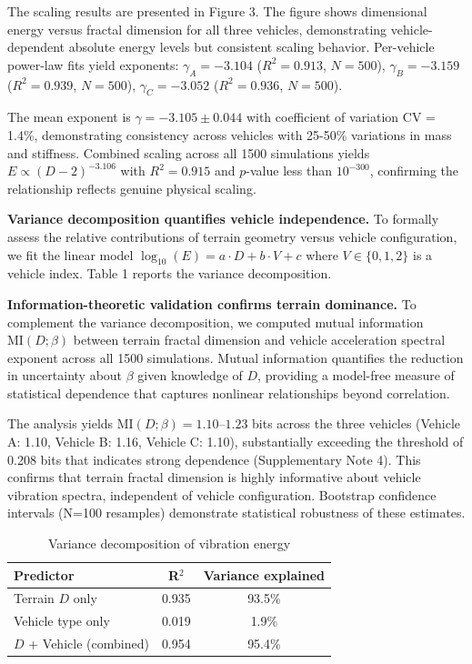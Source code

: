 \documentclass[11pt]{article}
\begin{document}
The scaling results are presented in Figure 3. The figure shows dimensional energy versus fractal dimension for all three vehicles, demonstrating vehicle-dependent absolute energy levels but consistent scaling behavior. Per-vehicle power-law fits yield exponents: $\gamma_A = -3.104$ ($R^2 = 0.913$, $N = 500$), $\gamma_B = -3.159$ ($R^2 = 0.939$, $N = 500$), $\gamma_C = -3.052$ ($R^2 = 0.936$, $N = 500$). 

The mean exponent is $\gamma = -3.105 \pm 0.044$ with coefficient of variation CV = 1.4\%, demonstrating consistency across vehicles with 25-50\% variations in mass and stiffness. Combined scaling across all 1500 simulations yields $E \propto (D-2)^{-3.106}$ with $R^2 = 0.915$ and $p$-value less than $10^{-300}$, confirming the relationship reflects genuine physical scaling.

\textbf{Variance decomposition quantifies vehicle independence.} To formally assess the relative contributions of terrain geometry versus vehicle configuration, we fit the linear model $\log_{10}(E) = a \cdot D + b \cdot V + c$ where $V \in \{0,1,2\}$ is a vehicle index. Table 1 reports the variance decomposition.

\textbf{Information-theoretic validation confirms terrain dominance.} To complement the variance decomposition, we computed mutual information $\text{MI}(D;\beta)$ between terrain fractal dimension and vehicle acceleration spectral exponent across all 1500 simulations. Mutual information quantifies the reduction in uncertainty about $\beta$ given knowledge of $D$, providing a model-free measure of statistical dependence that captures nonlinear relationships beyond correlation\cite{Cover2006}. 

The analysis yields $\text{MI}(D;\beta) = 1.10$--$1.23$ bits across the three vehicles (Vehicle A: 1.10, Vehicle B: 1.16, Vehicle C: 1.10), substantially exceeding the threshold of 0.208 bits that indicates strong dependence (Supplementary Note 4). This confirms that terrain fractal dimension is highly informative about vehicle vibration spectra, independent of vehicle configuration. Bootstrap confidence intervals (N=100 resamples) demonstrate statistical robustness of these estimates.

\begin{table}[h]
\centering
\caption{Variance decomposition of vibration energy}
\begin{tabular}{lcc}
\hline
Predictor & R$^2$ & Variance explained \\
\hline
Terrain $D$ only & 0.935 & 93.5\% \\
Vehicle type only & 0.019 & 1.9\% \\
$D$ + Vehicle (combined) & 0.954 & 95.4\% \\
\hline
\end{tabular}
\label{tab:variance}
\end{table}
\end{document}

